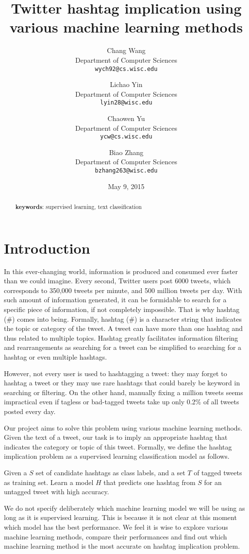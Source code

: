 \documentclass[letterpaper,11pt,twocolumn]{article}
\title{\bf{Twitter hashtag implication using various machine learning methods}}
\author{
  Chang Wang\\
  Department of Computer Sciences\\
  \texttt{wych92@cs.wisc.edu}
  \and
  Lichao Yin\\
  Department of Computer Sciences\\
  \texttt{lyin28@wisc.edu}
  \and
  Chaowen Yu\\
  Department of Computer Sciences\\
  \texttt{ycw@cs.wisc.edu}
  \and
  Biao Zhang\\
  Department of Computer Sciences\\
  \texttt{bzhang263@wisc.edu}
}
\date{May 9, 2015}
\begin{document}
\twocolumn[
\maketitle
]
\begin{abstract}
\textbf{keywords}: supervised learning, text classification
\end{abstract}


\section{Introduction}
\label{sec:intro}

In this ever-changing world, information is produced and consumed ever faster than we could imagine. Every second, Twitter users post 6000 tweets, which corresponds to 350,000 tweets per minute, and 500 million tweets per day. With such amount of information generated, it can be formidable to search for a specific piece of information, if not completely impossible. That is why hashtag (\#) comes into being. Formally, hashtag (\#) is a character string that indicates the topic or category of the tweet. A tweet can have more than one hashtag and thus related to multiple topics. Hashtag greatly facilitates information filtering and rearrangements as searching for a tweet can be simplified to searching for a hashtag or even multiple hashtags.

However, not every user is used to hashtagging a tweet: they may forget to hashtag a tweet or they may use rare hashtags that could barely be keyword in searching or filtering. On the other hand, manually fixing a million tweets seems impractical even if tagless or bad-tagged tweets take up only 0.2\% of all tweets posted every day.

Our project aims to solve this problem using various machine learning methods. Given the text of a tweet, our task is to imply an appropriate hashtag that indicates the category or topic of this tweet. Formally, we define the hashtag implication problem as a supervised learning classification model as follows.

\begin{definition}
Given a $S$ set of candidate hashtags as class labels, and a set $T$ of tagged tweets as training set. Learn a model $H$ that predicts one hashtag from $S$ for an untagged tweet with high accuracy.
\end{definition}

We do not specify deliberately which machine learning model we will be using as long as it is supervised learning. This is because it is not clear at this moment which model has the best performance. We feel it is wise to explore various machine learning methods, compare their performances and find out which machine learning method is the most accurate on hashtag implication problem.
\end{document}
